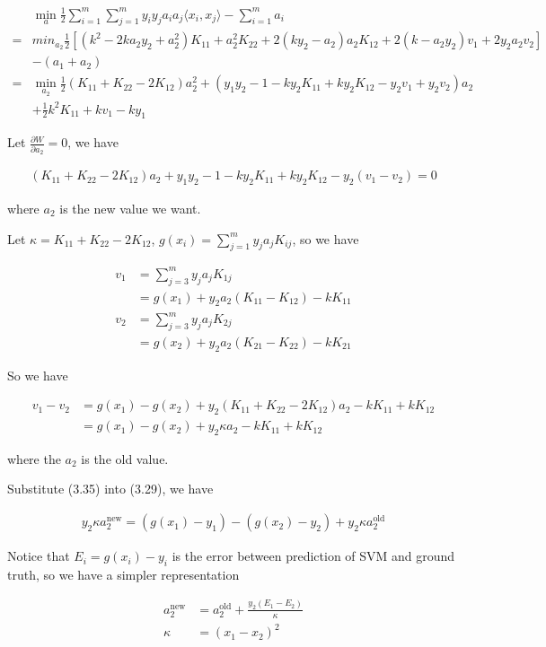 \documentclass[a4paper]{report}
\begin{document}
\begin{align}
    &\min_a \frac{1}{2}\sum_{i=1}^m\sum_{j=1}^m y_iy_ja_ia_j\langle x_i,x_j\rangle - \sum_{i=1}^m a_i \\
    =&min_{a_2}\frac{1}{2} [(k^2-2ka_2y_2+a_2^2)K_{11}+a_2^2K_{22}+2(ky_2-a_2)a_2K_{12}+2(k-a_2y_2)v_1+2y_2a_2v_2] \\
    &-(a_1+a_2) \\
    =&\min_{a_2}\frac{1}{2}(K_{11}+K_{22}-2K_{12})a_2^2+(y_1y_2-1-ky_2K_{11}+ky_2K_{12}-y_2v_1+y_2v_2)a_2 \\
    & +\frac{1}{2}k^2K_{11}+kv_1-ky_1
\end{align}

Let $\frac{\partial W}{\partial a_2}=0$, we have

\begin{align}
    (K_{11}+K_{22}-2K_{12})a_2+y_1y_2-1-ky_2K_{11}+ky_2K_{12}-y_2(v_1-v_2)=0
\end{align}

where $a_2$ is the new value we want.

Let $\kappa=K_{11}+K_{22}-2K_{12}$, $g(x_i)=\sum_{j=1}^my_ja_jK_{ij}$, so we have

\begin{align}
    v_1 &=\sum_{j=3}^my_ja_jK_{1j} \\
    &=g(x_1)+y_2a_2(K_{11}-K_{12})-kK_{11} \\
    v_2 &=\sum_{j=3}^my_ja_jK_{2j} \\
    &=g(x_2)+y_2a_2(K_{21}-K_{22})-kK_{21} 
\end{align}

So we have

\begin{align}
    v_1-v_2&=g(x_1)-g(x_2)+y_2(K_{11}+K_{22}-2K_{12})a_2-kK_{11}+kK_{12} \\
    &=g(x_1)-g(x_2)+y_2\kappa a_2-kK_{11}+kK_{12} 
\end{align}

where the $a_2$ is the old value.

Substitute (3.35) into (3.29), we have

\begin{align}
    y_2\kappa a_2^{\mathrm{new}}=(g(x_1)-y_1)-(g(x_2)-y_2)+y_2\kappa a_2^{\mathrm{old}}
\end{align}

Notice that $E_i=g(x_i)-y_i$ is the error between prediction of SVM and ground truth, so we have a simpler representation

\begin{align}
    a_2^{\mathrm{new}} &= a_2^{\mathrm{old}}+\frac{y_2(E_1-E_2)}{\kappa} \\
    \kappa &=(x_1-x_2)^2
\end{align}
\end{document}
